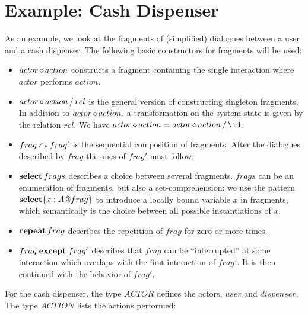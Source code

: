 \section{Example: Cash Dispenser}

As an example, we look at the fragments of (simplified) dialogues
between a user and a cash dispenser.  The
following basic constructors for fragments will be used:
\begin{itemize}
\item $actor \mathop{\diamond} action$ constructs a fragment containing the single
  interaction where $actor$ performs $action$.
\item $actor \mathop{\diamond} action \mathop{/} rel$ is the general version of
  constructing singleton fragments. In addition to $actor \mathop{\diamond} action$, a
  transformation on the system state is given by the relation $rel$.  We
  have $actor \ucmk action = actor \ucmk action \uctrans \id$.
\item $frag \curvearrowright frag'$ is the sequential composition of fragments.
  After the dialogues described by $frag$ the ones of $frag'$ must
  follow.  
\item $\mathop{{\mathbf{select}}} frags$ describes a choice between several fragments.
  $frags$ can be an enumeration of fragments, but also a
  set-comprehension: we use the pattern $\mathop{{\mathbf{select}}}\{x:A @ frag\}$
  to introduce a locally bound variable $x$ in fragments, which
  semantically is the choice between all possible instantiations
  of $x$.
\item $\mathop{{\mathbf{repeat}}} frag$ describes the repetition of $frag$ for 
  zero or more times.
\item $frag \mathrel{{\mathbf{except}}} frag'$ describes that $frag$ can be ``interrupted''
  at some interaction which overlaps with the first interaction of $frag'$.
  It is then continued with the behavior of $frag'$.
\end{itemize}

For the cash dispenser, the type $ACTOR$ defines the actors, $user$
and $dispenser$. The type $ACTION$ lists the actions performed: 
\begin{zedgroup}
\begin{zdirectives}
\end{zdirectives} \\
\end{zedgroup}

